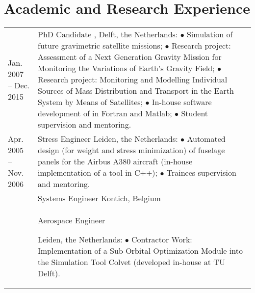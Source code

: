 \documentclass[a4paper]{article}
\newcommand{\dynhref}[2]{%
  \iftoggle{expliciturl}{%
    #2 (\href{#1}{\texttt{\detokenize{#1}}})%
  }{%
    \href{#1}{#2}%
  }%
}
\newcommand{\procv}[2]{\iftoggle{professionalcv}{#1}{#2}}
\newlength{\listskipbig}
\newenvironment{cvsection}[2]{
  \setlength{\floatsep}{0pt}
  \setlength{\textfloatsep}{0pt}
  \setlength{\intextsep}{0pt}
  \section*{#1}
  \begin{longtable}{lp{#2}}
}{
  \end{longtable}
}
\begin{document}
\begin{cvsection}{Academic and Research Experience}{10.8cm}
Jan. 2007 -- Dec. 2015
  & PhD Candidate\newline
    \dynhref{http://tinyurl.com/GRS-TUDelft}{Geoscience \& Remote Sensing}, \dynhref{http://www.tudelft.nl/}{Delft University of Technology}\newline
    Delft, the Netherlands:\newline
    $\bullet$ Simulation of future gravimetric satellite missions;\newline
    $\bullet$ Research project: Assessment of a Next Generation Gravity Mission for Monitoring the Variations of Earth's Gravity Field;\newline
    $\bullet$ Research project: Monitoring and Modelling Individual Sources of Mass Distribution and Transport in the Earth System by Means of Satellites;\newline
    $\bullet$ In-house software development of in Fortran and Matlab;\newline
    $\bullet$ Student supervision and mentoring.
    \\[\listskipbig]

Apr. 2005 -- Nov. 2006
  & Stress Engineer\newline
    \dynhref{http://www.globaltechnics.nl/}{Global Technics}\newline
    Leiden, the Netherlands:\newline
    $\bullet$ Automated design (for weight and stress minimization) of fuselage panels for the Airbus A380 aircraft (in-house implementation of a tool in C++);\newline
    $\bullet$ Trainees supervision and mentoring.
    \\[\listskipbig]

\procv{
6/2005 -- 7/2005 & Systems Engineer \newline
                 \dynhref{http://www.reduct.net}{Reduct}\newline
                   Kontich, Belgium\\[\listskipbig]
}{}

Oct. 2004 -- Jan. 2005
  & Aerospace Engineer\newline
    \dynhref{http://www.delta-utec.com/}{Delta-Utec}
    Leiden, the Netherlands:\newline
      $\bullet$ Contractor Work: Implementation of a Sub-Orbital Optimization Module into the Simulation Tool Colvet (developed in-house at TU Delft).
    \\[\listskipbig]


\end{cvsection}
\end{document}
